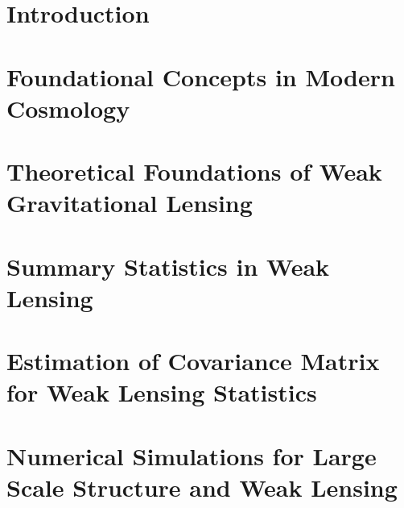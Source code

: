 \documentclass[11pt,a4paper]{ipmu}
\begin{document}
\makethesistitle
\frontmatter

\newpage
\thispagestyle{empty}
\mbox{}
\newpage


\begin{abstractpage}
    
\end{abstractpage}


    





\clearpage


\tableofcontents  %
\listoffigures    %
\listoftables     %


\chapter{Introduction}
\label{chap:introduction}
\mainmatter
\minitoc


\chapter{Foundational Concepts in Modern Cosmology}
\label{chap:cosmology}
\minitoc


\chapter{Theoretical Foundations of Weak Gravitational Lensing}
\label{chap:weak_lensing}
\minitoc 


\chapter{Summary Statistics in Weak Lensing}
\label{chap:statistics}
\minitoc 


\chapter{Estimation of Covariance Matrix for Weak Lensing Statistics}
\label{chap:covariance}
\minitoc 


\chapter{Numerical Simulations for Large Scale Structure and Weak Lensing}
\label{chap:simulation}
\minitoc 

\end{document}

